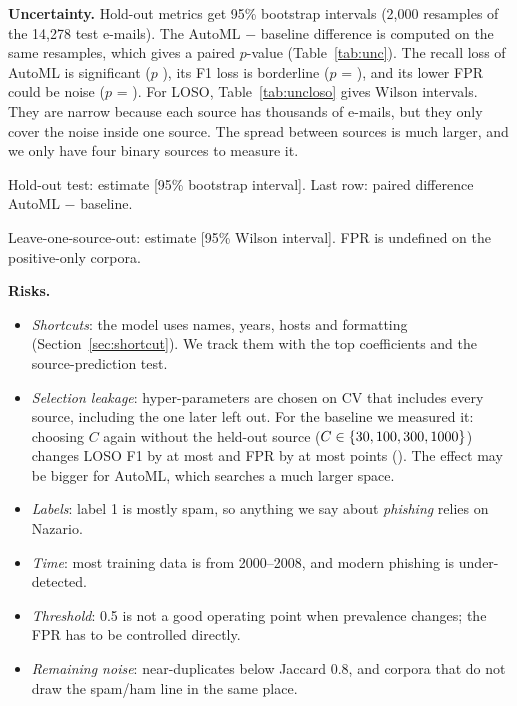 \documentclass[11pt,a4paper]{article}
\newcommand{\tab}[1]{}
\begin{document}
\textbf{Uncertainty.} Hold-out metrics get 95\% bootstrap intervals (2,000 resamples of the 14,278 test e-mails). The AutoML $-$ baseline difference is computed on the same resamples, which gives a paired $p$-value (Table~\ref{tab:unc}). The recall loss of AutoML is significant ($p$ \pDiffRecall), its F1 loss is borderline ($p$ = \pDiffFone), and its lower FPR could be noise ($p$ = \pDiffFPR). For LOSO, Table~\ref{tab:uncloso} gives Wilson intervals. They are narrow because each source has thousands of e-mails, but they only cover the noise inside one source. The spread between sources is much larger, and we only have four binary sources to measure it.
\begin{table}[H]\centering\small
\caption{Hold-out test: estimate [95\% bootstrap interval]. Last row: paired difference AutoML $-$ baseline.}\label{tab:unc}
\begin{adjustbox}{max width=\linewidth}\tab{tab_uncertainty}\end{adjustbox}
\end{table}
\begin{table}[H]\centering\small
\caption{Leave-one-source-out: estimate [95\% Wilson interval]. FPR is undefined on the positive-only corpora.}\label{tab:uncloso}
\begin{adjustbox}{max width=\linewidth}\tab{tab_uncertainty_loso}\end{adjustbox}
\end{table}

\textbf{Risks.}
\begin{itemize}
\item \emph{Shortcuts}: the model uses names, years, hosts and formatting (Section~\ref{sec:shortcut}). We track them with the top coefficients and the source-prediction test.
\item \emph{Selection leakage}: hyper-parameters are chosen on CV that includes every source, including the one later left out. For the baseline we measured it: choosing $C$ again without the held-out source ($C\in\{30, 100, 300, 1000\}$) changes LOSO F1 by at most \nestedMaxDFone{} and FPR by at most \nestedMaxDFPR{} points (). The effect may be bigger for AutoML, which searches a much larger space.
\item \emph{Labels}: label 1 is mostly spam, so anything we say about \emph{phishing} relies on Nazario.
\item \emph{Time}: most training data is from 2000--2008, and modern phishing is under-detected.
\item \emph{Threshold}: 0.5 is not a good operating point when prevalence changes; the FPR has to be controlled directly.
\item \emph{Remaining noise}: near-duplicates below Jaccard 0.8, and corpora that do not draw the spam/ham line in the same place.
\end{itemize}
\end{document}
